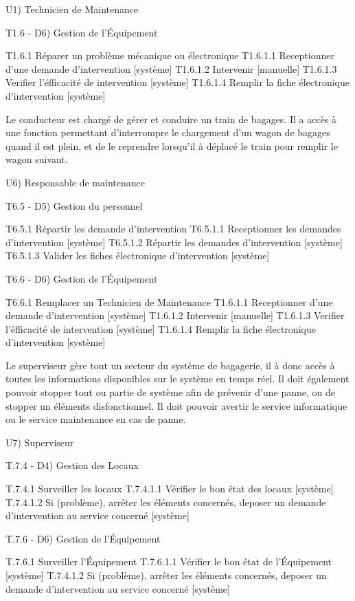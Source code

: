 U1) Technicien de Maintenance

T1.6 - D6) Gestion de l'Équipement

	T1.6.1 Réparer un problème mécanique ou électronique 
		T1.6.1.1 Receptionner d'une demande d'intervention [système]
		T1.6.1.2 Intervenir [manuelle]
		T1.6.1.3 Verifier l'éfficacité de intervention [système]
		T1.6.1.4 Remplir la fiche électronique d'intervention [système]


\item[U2) Conducteur] Le conducteur est chargé de gérer et conduire un train de
bagages. Il a accès à une fonction permettant d'interrompre le chargement d'un
wagon de bagages quand il est plein, et de le reprendre lorsqu'il à déplacé le
train pour remplir le wagon suivant.

U6) Responsable de maintenance

T6.5 - D5) Gestion du personnel

	T6.5.1 Répartir les demande d'intervention 
		T6.5.1.1 Receptionner les demandes d'intervention [système]
		T6.5.1.2 Répartir les demandes d'intervention [système]
		T6.5.1.3 Valider les fiches électronique d'intervention [système]
	
T6.6 - D6) Gestion de l'Équipement

	T6.6.1 Remplacer un Technicien de Maintenance 
		T1.6.1.1 Receptionner d'une demande d'intervention [système]
		T1.6.1.2 Intervenir [manuelle]
		T1.6.1.3 Verifier l'éfficacité de intervention [système]
		T1.6.1.4 Remplir la fiche électronique d'intervention [système]

\item[U7) Superviseur] Le superviseur gère tout un secteur du système de
bagagerie, il à donc accès à toutes les informations disponibles sur le système
en temps réel. Il doit également pouvoir stopper tout ou partie de système afin
de prévenir d'une panne, ou de stopper un éléments disfonctionnel. Il doit
pouvoir avertir le service informatique ou le service maintenance en cas de panne.

U7) Superviseur

T.7.4 - D4) Gestion des Locaux

	T.7.4.1 Surveiller les locaux
		T.7.4.1.1 Vérifier le bon état des locaux [système]
		T.7.4.1.2 Si (problème), arrêter les éléments concernés, deposer un demande d'intervention au service concerné [système]

T.7.6 - D6) Gestion de l'Équipement

	T.7.6.1 Surveiller l'Équipement
		T.7.6.1.1 Vérifier le bon état de l'Équipement [système]
		T.7.4.1.2 Si (problème), arrêter les éléments concernés, deposer un demande d'intervention au service concerné [système]

